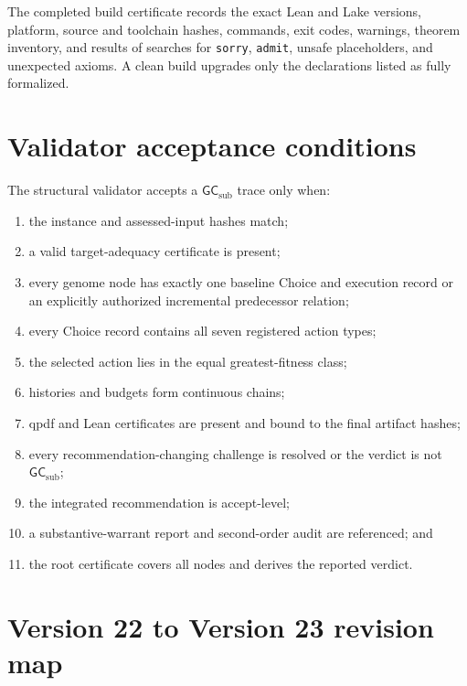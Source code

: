 \documentclass[10pt]{article}
\newcommand{\GCsub}{\mathsf{GC}_{\mathrm{sub}}}
\begin{document}
The completed build certificate records the exact Lean and Lake versions, platform, source and toolchain hashes, commands, exit codes, warnings, theorem inventory, and results of searches for \texttt{sorry}, \texttt{admit}, unsafe placeholders, and unexpected axioms.  A clean build upgrades only the declarations listed as fully formalized.

\section{Validator acceptance conditions}

The structural validator accepts a $\GCsub$ trace only when:
\begin{enumerate}
  \item the instance and assessed-input hashes match;
  \item a valid target-adequacy certificate is present;
  \item every genome node has exactly one baseline Choice and execution record or an explicitly authorized incremental predecessor relation;
  \item every Choice record contains all seven registered action types;
  \item the selected action lies in the equal greatest-fitness class;
  \item histories and budgets form continuous chains;
  \item qpdf and Lean certificates are present and bound to the final artifact hashes;
  \item every recommendation-changing challenge is resolved or the verdict is not $\GCsub$;
  \item the integrated recommendation is accept-level;
  \item a substantive-warrant report and second-order audit are referenced; and
  \item the root certificate covers all nodes and derives the reported verdict.
\end{enumerate}

\section{Version 22 to Version 23 revision map}
\end{document}

